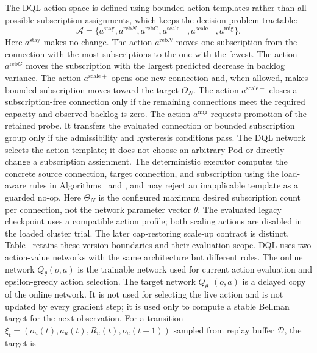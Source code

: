 The DQL action space is defined using bounded action templates rather than all
possible subscription assignments, which keeps the decision problem tractable:
\begin{equation}
	\mathcal{A}=
	\{a^{\mathrm{stay}},a^{\mathrm{reb}N},a^{\mathrm{reb}G},a^{\mathrm{scale}+},a^{\mathrm{scale}-},a^{\mathrm{mig}}\}.
	\label{eq:dql_actions}
\end{equation}
Here $a^{\mathrm{stay}}$ makes no change. The action $a^{\mathrm{reb}N}$ moves one subscription
from the connection with the most subscriptions to the one with the fewest.
The action $a^{\mathrm{reb}G}$ moves the subscription with the largest predicted decrease
in backlog variance. The action $a^{\mathrm{scale}+}$ opens one new connection and,
when allowed, makes bounded subscription moves toward the target $\Theta_N$.
The action $a^{\mathrm{scale}-}$ closes a subscription-free connection only if the
remaining connections meet the required capacity and observed backlog is zero.
The action $a^{\mathrm{mig}}$ requests promotion of the retained probe. It transfers the
evaluated connection or bounded subscription group only if the admissibility
and hysteresis conditions pass. The DQL network selects
the action template; it does not choose an arbitrary Pod or directly change a
subscription assignment. The deterministic executor computes the concrete
source connection, target connection, and subscription using the load-aware
rules in Algorithms~ and
, and may reject an inapplicable template as a
guarded no-op.
Here $\Theta_N$ is the configured maximum desired subscription count per
connection, not the network parameter vector $\theta$.
The evaluated legacy checkpoint uses a compatible action profile; both
scaling actions are disabled in the loaded cluster trial. The later
cap-restoring scale-up contract is distinct. Table~
retains these version boundaries and their evaluation scope.
DQL uses two action-value networks with the same architecture but different
roles. The online network $Q_\theta(o,a)$ is the trainable network used for
current action evaluation and epsilon-greedy action selection. The target
network $Q_{\theta^-}(o,a)$ is a delayed copy of the online network. It is not
used for selecting the live action and is not updated by every gradient step;
it is used only to compute a stable Bellman target for the next observation.
For a transition
$\xi_t=(o_u(t),a_u(t),R_u(t),o_u(t+1))$ sampled from replay buffer
$\mathcal{D}$, the target is
